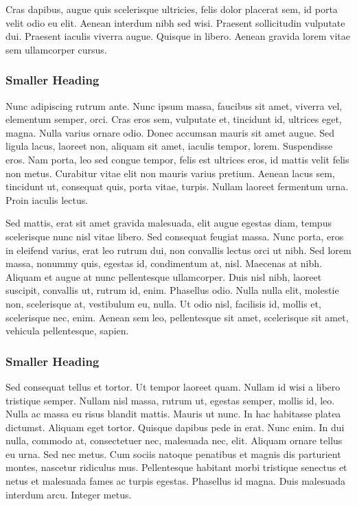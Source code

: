 Cras dapibus, augue quis scelerisque ultricies, felis dolor placerat sem, id porta velit odio eu
elit. Aenean interdum nibh sed wisi. Praesent sollicitudin vulputate dui. Praesent iaculis
viverra augue. Quisque in libero. Aenean gravida lorem vitae sem ullamcorper cursus.

\subsubsection{Smaller Heading}
Nunc adipiscing rutrum ante. Nunc ipsum massa, faucibus sit amet, viverra vel, elementum
semper, orci. Cras eros sem, vulputate et, tincidunt id, ultrices eget, magna. Nulla varius
ornare odio. Donec accumsan mauris sit amet augue. Sed ligula lacus, laoreet non, aliquam
sit amet, iaculis tempor, lorem. Suspendisse eros. Nam porta, leo sed congue tempor, felis
est ultrices eros, id mattis velit felis non metus. Curabitur vitae elit non mauris varius
pretium. Aenean lacus sem, tincidunt ut, consequat quis, porta vitae, turpis. Nullam laoreet
fermentum urna. Proin iaculis lectus.

Sed mattis, erat sit amet gravida malesuada, elit augue egestas diam, tempus scelerisque
nunc nisl vitae libero. Sed consequat feugiat massa. Nunc porta, eros in eleifend varius,
erat leo rutrum dui, non convallis lectus orci ut nibh. Sed lorem massa, nonummy quis,
egestas id, condimentum at, nisl. Maecenas at nibh. Aliquam et augue at nunc pellentesque
ullamcorper. Duis nisl nibh, laoreet suscipit, convallis ut, rutrum id, enim. Phasellus odio.
Nulla nulla elit, molestie non, scelerisque at, vestibulum eu, nulla. Ut odio nisl, facilisis id,
mollis et, scelerisque nec, enim. Aenean sem leo, pellentesque sit amet, scelerisque sit amet,
vehicula pellentesque, sapien.

\subsubsection{Smaller Heading}
Sed consequat tellus et tortor. Ut tempor laoreet quam. Nullam id wisi a libero tristique
semper. Nullam nisl massa, rutrum ut, egestas semper, mollis id, leo. Nulla ac massa eu
risus blandit mattis. Mauris ut nunc. In hac habitasse platea dictumst. Aliquam eget tortor.
Quisque dapibus pede in erat. Nunc enim. In dui nulla, commodo at, consectetuer nec,
malesuada nec, elit. Aliquam ornare tellus eu urna. Sed nec metus. Cum sociis natoque
penatibus et magnis dis parturient montes, nascetur ridiculus mus. Pellentesque habitant
morbi tristique senectus et netus et malesuada fames ac turpis egestas. Phasellus id magna.
Duis malesuada interdum arcu. Integer metus.

